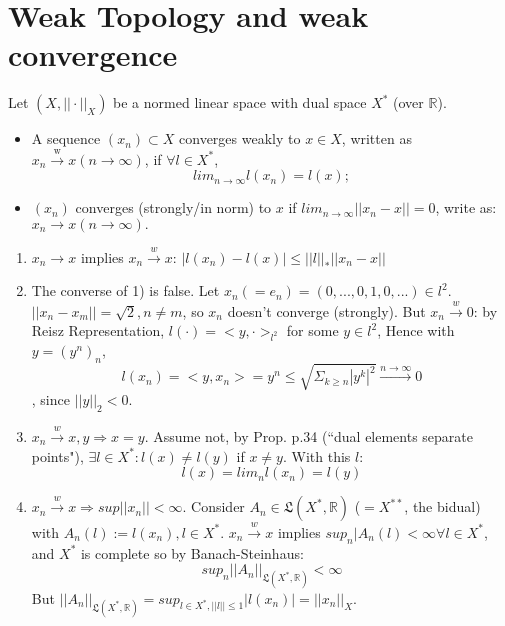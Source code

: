 \documentclass{article}
\begin{document}
  
\section{Weak Topology and weak convergence}
Let $(X, || \cdot ||_X)$ be a normed linear space with dual space $X^*$ (over $\mathbb{R}$).
\begin{definition}
\begin{itemize}
    \item A sequence $(x_n) \subset X$ converges weakly to $x\in X$, written as $x_n \xrightarrow{\text{w}} x (n \rightarrow \infty)$, if $\forall l \in X^*$, $$lim_{n\rightarrow \infty} l(x_n) = l(x);$$
    \item $(x_n)$ converges (strongly/in norm) to $x$ if $lim_{n\rightarrow \infty} ||x_n - x|| = 0$, write as: $x_n \rightarrow x (n\rightarrow \infty).$
\end{itemize}
\end{definition}

\begin{remark}
\begin{enumerate}
    \item $x_n\rightarrow x$ implies  $x_n \xrightarrow{w} x$: $|l(x_n) - l(x)| \leq ||l||_* ||x_n - x||$
    \item The converse of 1) is false. Let $x_n (= e_n) = (0,...,0,1,0,...) \in l^2$. $||x_n-x_m|| = \sqrt{2}, n\neq m$, so $x_n$ doesn't converge (strongly). But $x_n \xrightarrow{w} 0$: by Reisz Representation, $l(\cdot) = <y,\cdot>_{l^2}$ for some $y \in l^2$, Hence with $y=(y^n)_n$, $$l(x_n) = <y,x_n> = y^n \leq \sqrt{\Sigma_{k\geq n} {|y^k|}^2} \xrightarrow{n\rightarrow \infty} 0$$, since $||y||_2 < 0$.
    \item $x_n \xrightarrow{w} x, y \Rightarrow x=y$. Assume not, by Prop. p.34 (\textquotedblleft dual elements separate points"), $\exists l \in X^*: l(x) \neq l(y)$ if $x\neq y$. With this $l$: $$l(x) = lim_{n} l(x_n) = l(y) $$ 
    \item $x_n \xrightarrow{w} x \Rightarrow sup||x_n|| < \infty$. Consider $A_n \in \mathfrak{L}(X^*, \mathbb{R})$ ($=X^{**}$, the bidual) with $A_n(l) := l(x_n), l\in X^*$. $x_n \xrightarrow{w} x$ implies $sup_n |A_n(l) < \infty \forall l\in X^*$, and $X^*$ is complete so by Banach-Steinhaus: $$sup_n ||A_n||_{\mathfrak{L}(X^*, \mathbb{R})} < \infty$$ But $||A_n||_{\mathfrak{L}(X^*,\mathbb{R})} = sup_{l\in X^*, ||l||\leq 1} |l(x_n)| = ||x_n||_X$.
\end{enumerate}
\end{remark}
\end{document}
